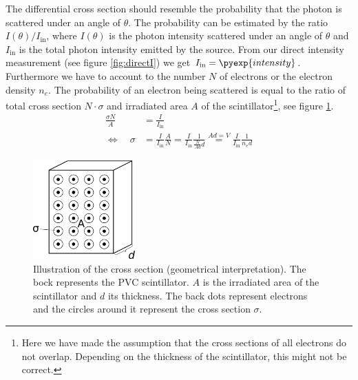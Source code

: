 The differential cross section should resemble the probability that the
photon is scattered under an angle of $\theta$.  The probability can be
estimated by the ratio $I(\theta) / I_{\mathrm{in}}$, where $I(\theta)$ is
the photon intensity scattered under an angle of $\theta$ and
$I_{\mathrm{in}}$ is the total photon intensity emitted by the \Cs source.
From our direct intensity measurement (see figure \ref{fig:directI}) we get
$I_{\mathrm{in}} = \pyexp{intensity}$. Furthermore we have to account to the
number $N$ of electrons or the electron density $n_e$. The probability of an
electron being scattered is equal to the ratio of total cross section $N
\cdot \sigma$ and irradiated area $A$ of the scintillator\footnote{ Here we
have made the assumption that the cross sections of all electrons do not
overlap. Depending on the thickness of the scintillator, this might not be
correct.}, see figure \ref{fig:crossDer}.
\begin{align}
  \frac{\sigma N}{A} &= \frac{I}{I_{\mathrm{in}}} \\
 \Leftrightarrow\quad \sigma &= \frac{I}{I_{\mathrm{in}}} \frac{A}{N} = 
    \frac{I}{I_{\mathrm{in}}} \frac{1}{\frac{N}{A d} d} \overset{Ad=V}{=}
    \frac{I}{I_{\mathrm{in}}} \frac{1}{n_e d}
    \label{eq:predcs}
\end{align}
\begin{figure}[h!]
  \centering
  \includegraphics[width=0.35\textwidth]{cross.png}
  \caption{Illustration of the cross section (geometrical interpretation). The
  bock represents the PVC scintillator. $A$ is the irradiated area of the
  scintillator and $d$ its thickness. The back dots represent electrons and the
  circles around it represent the cross section $\sigma$.}
  \label{fig:crossDer}
\end{figure}

